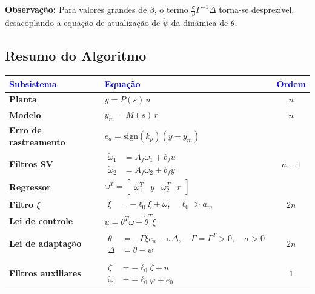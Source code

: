 \documentclass[10pt]{article}
\begin{document}
\textbf{Observação:} Para valores grandes de \(\beta\), o termo \( \frac{\sigma}{\beta} \Gamma^{-1} \Delta \) torna-se desprezível, desacoplando a equação de atualização de \(\dot{\psi}\) da dinâmica de \(\theta\).

\newpage

\subsection{Resumo do Algoritmo}

\begin{table}[htbp]
\centering
\begin{tabular}{|>{\bfseries}m{4cm}|m{7cm}|c|}
\hline
\textcolor{blue}{Subsistema} & \textcolor{blue}{Equação} & \textcolor{blue}{Ordem} \\
\hline
Planta & $y = P(s)\,u$ & $n$ \\
\hline
Modelo & $y_m = M(s)\,r$ & $n$ \\
\hline
Erro de rastreamento & $e_a = \text{sign}(k_p)(y - y_m)$ & \\
\hline
Filtros SV & 
$\begin{aligned}
\dot{\omega}_1 &= A_f \omega_1 + b_f u \\
\dot{\omega}_2 &= A_f \omega_2 + b_f y
\end{aligned}$ & $n-1$ \\
\hline
Regressor & $\omega^T = \begin{bmatrix} \omega_1^T & y & \omega_2^T & r \end{bmatrix}$ & \\
\hline
Filtro $\xi$ & 
$\begin{aligned}
\xi &= -\ell_0 \xi + \omega, \quad \ell_0 > a_m
\end{aligned}$ & $2n$ \\
\hline
Lei de controle & $u = \theta^T \omega + \dot{\theta}^T \xi$ & \\
\hline
Lei de adaptação & 
$\begin{aligned}
\dot{\theta} &= -\Gamma \xi e_a - \sigma \Delta, \quad \Gamma = \Gamma^T > 0, \quad \sigma > 0 \\
\Delta &= \theta - \psi
\end{aligned}$ & $2n$ \\
\hline
Filtros auxiliares & 
$\begin{aligned}
\dot{\zeta} &= -\ell_0 \zeta + u \\
\dot{\varphi} &= -\ell_0 \varphi + e_0
\end{aligned}$ & $1$ \\

\end{tabular}
\end{table}
\end{document}
